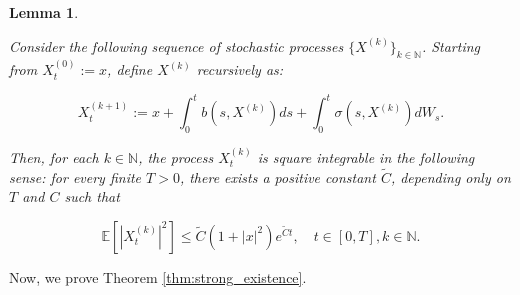 \documentclass{article}
\newtheorem{lemma}{Lemma}
\begin{document}
\begin{lemma} \label{lemma:strong_existance}

Consider the following sequence of stochastic processes $\{X^{(k)}\}_{k\in\mathbb{N}}$. Starting from $X^{(0)}_t:=x$, define $X^{(k)}$ recursively as:

\begin{equation} \label{eq:iterative_process}
X^{(k+1)}_t := x + \int^t_0 b(s,X^{(k)})ds + \int^t_0 \sigma(s,X^{(k)})dW_s.
\end{equation}

Then, for each $k\in\mathbb{N}$, the process $X^{(k)}_t$ is square integrable in the following sense: for every finite $T>0$, there exists a positive constant $\tilde{C}$, depending only on $T$ and $C$ such that

\begin{equation} \label{lemma:strong_existence_integrability}
\mathbb{E}[|X_t^{(k)}|^2]\leq\tilde{C}(1+|x|^2)e^{\tilde{C}t}, \quad t\in[0,T],k\in\mathbb{N}.
\end{equation}
\end{lemma}

Now, we prove Theorem \ref{thm:strong_existence}.
\end{document}
